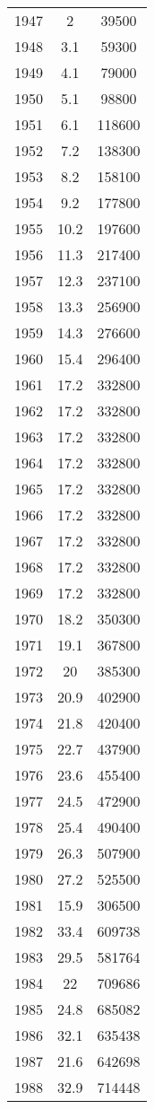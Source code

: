 \documentclass[11pt]{book}
\begin{document}
\begin{longtable}[t]{ccc}
1947 & 2 & 39500\\
1948 & 3.1 & 59300\\
1949 & 4.1 & 79000\\
1950 & 5.1 & 98800\\
1951 & 6.1 & 118600\\
1952 & 7.2 & 138300\\
1953 & 8.2 & 158100\\
1954 & 9.2 & 177800\\
1955 & 10.2 & 197600\\
1956 & 11.3 & 217400\\
1957 & 12.3 & 237100\\
1958 & 13.3 & 256900\\
1959 & 14.3 & 276600\\
1960 & 15.4 & 296400\\
1961 & 17.2 & 332800\\
1962 & 17.2 & 332800\\
1963 & 17.2 & 332800\\
1964 & 17.2 & 332800\\
1965 & 17.2 & 332800\\
1966 & 17.2 & 332800\\
1967 & 17.2 & 332800\\
1968 & 17.2 & 332800\\
1969 & 17.2 & 332800\\
1970 & 18.2 & 350300\\
1971 & 19.1 & 367800\\
1972 & 20 & 385300\\
1973 & 20.9 & 402900\\
1974 & 21.8 & 420400\\
1975 & 22.7 & 437900\\
1976 & 23.6 & 455400\\
1977 & 24.5 & 472900\\
1978 & 25.4 & 490400\\
1979 & 26.3 & 507900\\
1980 & 27.2 & 525500\\
1981 & 15.9 & 306500\\
1982 & 33.4 & 609738\\
1983 & 29.5 & 581764\\
1984 & 22 & 709686\\
1985 & 24.8 & 685082\\
1986 & 32.1 & 635438\\
1987 & 21.6 & 642698\\
1988 & 32.9 & 714448\\

\end{longtable}
\end{document}
